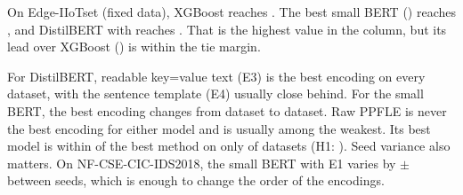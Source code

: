 On Edge-IIoTset (fixed data), XGBoost reaches . The best small BERT
() reaches , and DistilBERT with
 reaches . That is the highest
value in the column, but its lead over XGBoost
() is within the tie margin.

For DistilBERT, readable key=value text (E3) is the best encoding on every dataset, with the sentence template (E4)
usually close behind. For the small BERT, the best encoding changes from dataset to dataset. Raw PPFLE is never the
best encoding for either model and is usually among the weakest. Its best model is within
 of the best method on only  of 
datasets (H1: ). Seed variance also matters. On NF-CSE-CIC-IDS2018, the small BERT with E1 varies
by $\pm$ between seeds, which is enough to change the
order of the encodings.

